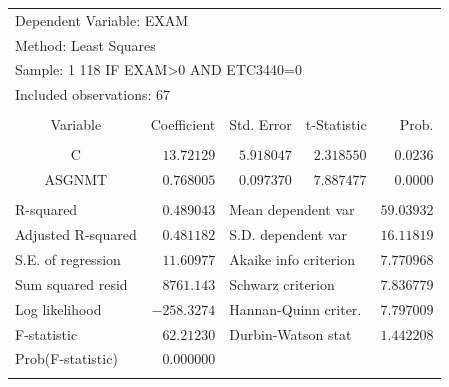\documentclass[12pt]{report}
\begin{document}
\begin{table}[H]
	\centering
	\begin{tabular}{lrrrr}
		\multicolumn{3}{l}{Dependent Variable: EXAM}&\multicolumn{1}{c}{}&\multicolumn{1}{c}{}\\
		\multicolumn{3}{l}{Method: Least Squares}&\multicolumn{1}{c}{}&\multicolumn{1}{c}{}\\
		\multicolumn{4}{l}{Sample: 1 118 IF EXAM\textgreater 0 AND ETC3440=0}&\multicolumn{1}{c}{}\\
		\multicolumn{3}{l}{Included observations: 67}&\multicolumn{1}{c}{}&\multicolumn{1}{c}{}\\
		[4.5pt] \hline \\ [-4.5pt]
		\multicolumn{1}{c}{Variable}&\multicolumn{1}{r}{Coefficient}&\multicolumn{1}{r}{Std. Error}&\multicolumn{1}{r}{t-Statistic}&\multicolumn{1}{r}{Prob.}\\
		[4.5pt] \hline \\ [-4.5pt]
		\multicolumn{1}{c}{C}&\multicolumn{1}{r}{$13.72129$}&\multicolumn{1}{r}{$5.918047$}&\multicolumn{1}{r}{$2.318550$}&\multicolumn{1}{r}{$0.0236$}\\
		\multicolumn{1}{c}{ASGNMT}&\multicolumn{1}{r}{$0.768005$}&\multicolumn{1}{r}{$0.097370$}&\multicolumn{1}{r}{$7.887477$}&\multicolumn{1}{r}{$0.0000$}\\
		[4.5pt] \hline \\ [-4.5pt]
		\multicolumn{1}{l}{R-squared}&\multicolumn{1}{r}{$0.489043$}&\multicolumn{2}{l}{Mean dependent var}&\multicolumn{1}{r}{$59.03932$}\\
		\multicolumn{1}{l}{Adjusted R-squared}&\multicolumn{1}{r}{$0.481182$}&\multicolumn{2}{l}{S.D. dependent var}&\multicolumn{1}{r}{$16.11819$}\\
		\multicolumn{1}{l}{S.E. of regression}&\multicolumn{1}{r}{$11.60977$}&\multicolumn{2}{l}{Akaike info criterion}&\multicolumn{1}{r}{$7.770968$}\\
		\multicolumn{1}{l}{Sum squared resid}&\multicolumn{1}{r}{$8761.143$}&\multicolumn{2}{l}{Schwarz criterion}&\multicolumn{1}{r}{$7.836779$}\\
		\multicolumn{1}{l}{Log likelihood}&\multicolumn{1}{r}{$-258.3274$}&\multicolumn{2}{l}{Hannan-Quinn criter.}&\multicolumn{1}{r}{$7.797009$}\\
		\multicolumn{1}{l}{F-statistic}&\multicolumn{1}{r}{$62.21230$}&\multicolumn{2}{l}{Durbin-Watson stat}&\multicolumn{1}{r}{$1.442208$}\\
		\multicolumn{1}{l}{Prob(F-statistic)}&\multicolumn{1}{r}{$0.000000$}&\multicolumn{1}{c}{}&\multicolumn{1}{c}{}&\multicolumn{1}{c}{}\\
		[4.5pt] \hline \\ [-4.5pt]
	\end{tabular}
\end{table}
\end{document}
